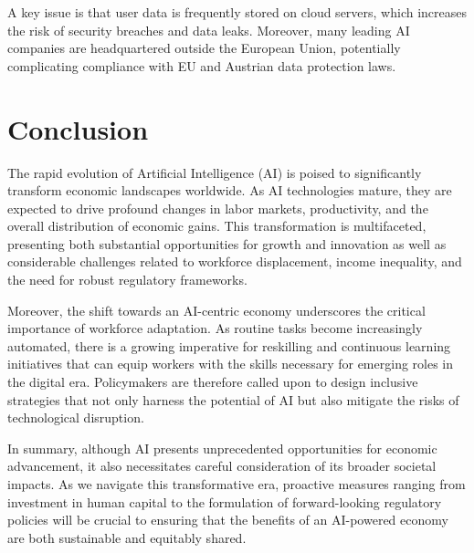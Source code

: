 A key issue is that user data is frequently stored on cloud servers, which increases the risk of security breaches and data leaks. Moreover, many leading AI companies are headquartered outside the European Union, potentially complicating compliance with EU and Austrian data protection laws.


\section{Conclusion}
\label{sec:conclusion}

The rapid evolution of Artificial Intelligence (AI) is poised to significantly transform economic landscapes worldwide. 
As AI technologies mature, they are expected to drive profound changes in labor markets, productivity, and the overall distribution of economic gains. 
This transformation is multifaceted, presenting both substantial opportunities for growth and innovation as well as considerable challenges related to workforce displacement,
income inequality, and the need for robust regulatory frameworks.

Moreover, the shift towards an AI-centric economy underscores the critical importance of workforce adaptation. 
As routine tasks become increasingly automated, there is a growing imperative for reskilling and continuous learning initiatives that can equip workers with the skills 
necessary for emerging roles in the digital era. Policymakers are therefore called upon to design inclusive strategies that not only harness the potential 
of AI but also mitigate the risks of technological disruption.

In summary, although AI presents unprecedented opportunities for economic advancement, 
it also necessitates careful consideration of its broader societal impacts. As we navigate this transformative era, 
proactive measures ranging from investment in human capital to the formulation of forward-looking regulatory policies 
will be crucial to ensuring that the benefits of an AI-powered economy are both sustainable and equitably shared.
